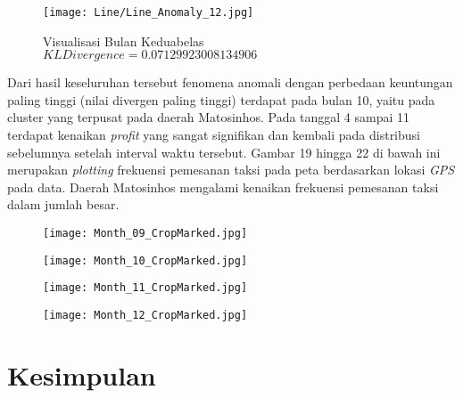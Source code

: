 \documentclass{article}
\begin{document}
\begin{figure}[H]
	\centering
	\texttt{[image: Line/Line\_Anomaly\_12.jpg]}
	\caption{Visualisasi Bulan Keduabelas\\$KL Divergence = 0.07129923008134906$}
\end{figure}

Dari hasil keseluruhan tersebut fenomena anomali dengan  perbedaan keuntungan paling tinggi (nilai divergen paling tinggi) terdapat pada bulan 10, yaitu pada cluster yang terpusat pada daerah Matosinhos. Pada tanggal 4 sampai 11 terdapat kenaikan \textit{profit} yang sangat signifikan dan kembali pada distribusi sebelumnya setelah interval waktu tersebut. Gambar 19 hingga 22 di bawah ini merupakan \textit{plotting} frekuensi pemesanan taksi pada peta berdasarkan lokasi \textit{GPS} pada data. Daerah Matosinhos mengalami kenaikan frekuensi pemesanan taksi dalam jumlah besar.

\begin{figure}[H]
	\centering
	\begin{minipage}{.4\textwidth}
		\centering
		\texttt{[image: Month\_09\_CropMarked.jpg]}
	\end{minipage}%
	\hspace{.1\textwidth}
	\begin{minipage}{.4\textwidth}
		\centering
		\texttt{[image: Month\_10\_CropMarked.jpg]}
	\end{minipage}%
\end{figure}

\begin{figure}[H]
	\centering
	\begin{minipage}{.4\textwidth}
		\centering
		\texttt{[image: Month\_11\_CropMarked.jpg]}
	\end{minipage}%
	\hspace{.1\textwidth}
	\begin{minipage}{.4\textwidth}
		\centering
		\texttt{[image: Month\_12\_CropMarked.jpg]}
	\end{minipage}%
\end{figure}

\section{Kesimpulan}
\end{document}
